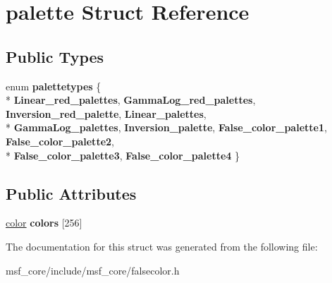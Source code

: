 \hypertarget{structpalette}{\section{palette Struct Reference}
\label{structpalette}
}
\subsection*{Public Types}
\begin{DoxyCompactItemize}
\item 
enum {\bfseries palettetypes} \{ \\*
{\bfseries Linear\-\_\-red\-\_\-palettes}, 
{\bfseries Gamma\-Log\-\_\-red\-\_\-palettes}, 
{\bfseries Inversion\-\_\-red\-\_\-palette}, 
{\bfseries Linear\-\_\-palettes}, 
\\*
{\bfseries Gamma\-Log\-\_\-palettes}, 
{\bfseries Inversion\-\_\-palette}, 
{\bfseries False\-\_\-color\-\_\-palette1}, 
{\bfseries False\-\_\-color\-\_\-palette2}, 
\\*
{\bfseries False\-\_\-color\-\_\-palette3}, 
{\bfseries False\-\_\-color\-\_\-palette4}
 \}
\end{DoxyCompactItemize}
\subsection*{Public Attributes}
\begin{DoxyCompactItemize}
\item 
\hypertarget{structpalette_aa1a2941bd65472f07de5e54bcf36678b}{\hyperlink{structcolor}{color} {\bfseries colors} \mbox{[}256\mbox{]}}\label{structpalette_aa1a2941bd65472f07de5e54bcf36678b}

\end{DoxyCompactItemize}


The documentation for this struct was generated from the following file\-:\begin{DoxyCompactItemize}
\item 
msf\-\_\-core/include/msf\-\_\-core/falsecolor.\-h\end{DoxyCompactItemize}
